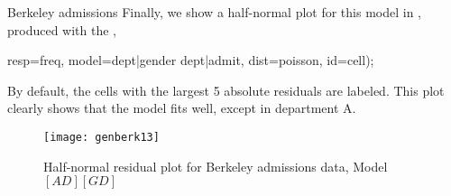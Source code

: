 \begin{Example}[berkeley9]{Berkeley admissions}
Finally, we show a half-normal plot for this model in ,
produced with the ,
\begin{listing}
   resp=freq, model=dept|gender dept|admit, dist=poisson, id=cell);
\end{listing}
By default, the cells with the largest 5 absolute residuals are labeled.
This plot clearly shows that the model fits well, except in department A.
\begin{figure}[htb]
  \centering
  \texttt{[image: genberk13]}
  \caption{Half-normal residual plot for Berkeley admissions data, Model $[AD] [GD]$}%
  \label{fig:genberk13}
\end{figure}
\end{Example}
